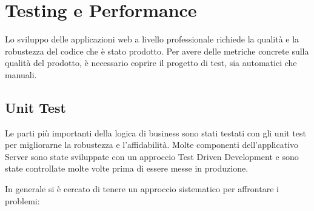 

\chapter{Testing e Performance}

Lo sviluppo delle applicazioni web a livello professionale richiede la qualità e la robustezza del codice che è stato prodotto. Per avere delle metriche concrete sulla qualità del prodotto, è necessario coprire il progetto di test, sia automatici che manuali.

\section{Unit Test}

Le parti più importanti della logica di business sono stati testati con gli unit test per migliorarne la robustezza e l'affidabilità. Molte componenti dell'applicativo Server sono state sviluppate con un approccio Test Driven Development e sono state controllate molte volte prima di essere messe in produzione.

\par In generale si è cercato di tenere un approccio sistematico per affrontare i problemi:

